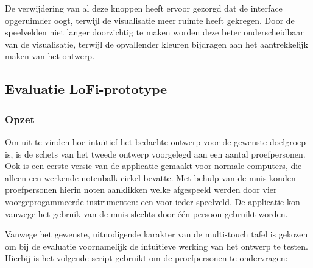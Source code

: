 \documentclass{acm}
\begin{document}
De verwijdering van al deze knoppen heeft ervoor gezorgd dat de interface opgeruimder oogt, terwijl de visualisatie meer ruimte heeft gekregen. Door de speelvelden niet langer doorzichtig te maken worden deze beter onderscheidbaar van de visualisatie, terwijl de opvallender kleuren bijdragen aan het aantrekkelijk maken van het ontwerp.\cite{Turatto}

\subsection{Evaluatie LoFi-prototype}
\subsubsection{Opzet}
Om uit te vinden hoe intu\"itief het bedachte ontwerp voor de gewenste doelgroep is, is de schets van het tweede ontwerp voorgelegd aan een aantal proefpersonen. Ook is een eerste versie van de applicatie gemaakt voor normale computers, die alleen een werkende notenbalk-cirkel bevatte. Met behulp van de muis konden proefpersonen hierin noten aanklikken welke afgespeeld werden door vier voorgeprogammeerde instrumenten: een voor ieder speelveld. De applicatie kon vanwege het gebruik van de muis slechts door \'e\'en persoon gebruikt worden.

Vanwege het gewenste, uitnodigende karakter van de multi-touch tafel is gekozen om bij de evaluatie voornamelijk de intu\"itieve werking van het ontwerp te testen. Hierbij is het volgende script gebruikt om de proefpersonen te ondervragen:
\end{document}
